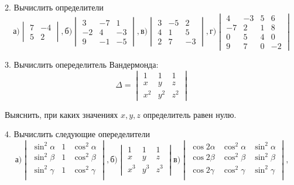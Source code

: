 \documentclass[12pt]{article}
\begin{document}
2. Вычислить определители
\[
\text{а)}
\begin{vmatrix}
7 & -4\\
5 & 2
\end{vmatrix},
\text{б)}
\begin{vmatrix}
3 & -7 & 1\\
-2 & 4 & -3\\
9 & -1 & -5
\end{vmatrix},
\text{в)}
\begin{vmatrix}
3 & -5 & 2\\
4 & 1 & 5\\
2 & 7 & -3
\end{vmatrix},
\text{г)}
\begin{vmatrix}
4 & -3 & 5 & 6\\
-7 & 2 & 1 & 8\\
 0 & 5 & 4 & 0\\
 9 & 7 & 0 & -2
\end{vmatrix}
\]

3. Вычислить опеределитель Вандермонда:
\[
\Delta = \begin{vmatrix}
1 & 1 & 1\\
x & y & z\\
x^2 & y^2 & z^2
\end{vmatrix}
\]

Выяснить, при каких значениях $x,y,z$ определитель равен нулю.

4. Вычислить следующие опеределители
\[
\text{а)}\begin{vmatrix}
\sin^2{\alpha} & 1 & \cos^2{\alpha}\\
\sin^2{\beta} & 1 & \cos^2{\beta}\\
\sin^2{\gamma} & 1 & \cos^2{\gamma}\\
\end{vmatrix},
\text{б)}\begin{vmatrix}
1 & 1 & 1\\
x & y & z\\
x^3 & y^3 & z^3
\end{vmatrix}
\text{в)}\begin{vmatrix}
\cos{2\alpha} & \cos^2{\alpha} & \sin^2{\alpha}\\
\cos{2\beta} & \cos^2{\beta} & \sin^2{\beta}\\
\cos{2\gamma} & \cos^2{\gamma} & \sin^2{\gamma}\\
\end{vmatrix},
\]
\end{document}
